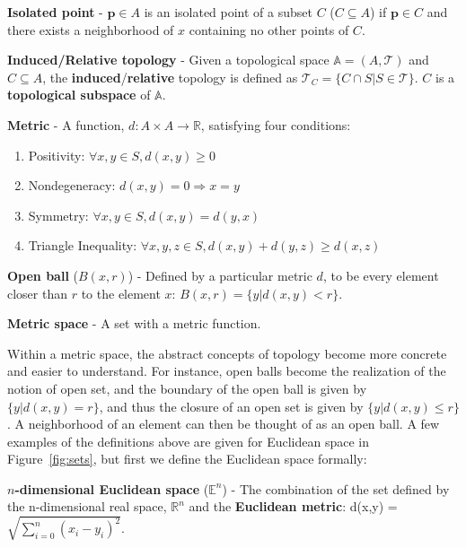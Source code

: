 \begin{defn}
  \textbf{Isolated point} - $\mathbf{p} \in A$ is an isolated point of a
  subset $C$ ($C \subseteq A$) if $\mathbf{p} \in C$ and there exists a
  neighborhood of $x$ containing no other points of $C$.
\end{defn}

\begin{defn}
  \textbf{Induced/Relative topology} - Given a topological space
  $\mathbb{A}=(A,\mathcal{T})$ and $C \subseteq A$,
  the \textbf{induced}/\textbf{relative} topology is defined as
  $\mathcal{T}_C = \{C \cap S | S \in \mathcal{T}\}$. $C$ is a
  \textbf{topological subspace} of $\mathbb{A}$.
\end{defn}

\begin{defn}
  \textbf{Metric} - A function, $d: A \times A \rightarrow \mathbb{R}$,
  satisfying four conditions:
  \begin{enumerate}
  \item Positivity: $\forall x,y \in S, d(x,y) \ge 0$
  \item Nondegeneracy: $d(x,y)=0 \Rightarrow x=y$
  \item Symmetry: $\forall x,y \in S, d(x,y) = d(y,x)$
  \item Triangle Inequality: $\forall x,y,z \in S, d(x,y) + d(y,z) \ge d(x,z)$
  \end{enumerate}
\end{defn}
\begin{defn}
  \textbf{Open ball} ($B(x,r)$) - Defined by a particular metric $d$, to be
  every element closer than $r$ to the element $x$: $B(x,r) = \{y| d(x,y) < r\}$.
\end{defn}
\begin{defn}
  \textbf{Metric space} - A set with a metric function.
\end{defn}

Within a metric space, the abstract concepts of topology become more concrete and easier to understand.
%
For instance, open balls become the realization of the notion of open set, and the boundary of the open ball is given by $\{y| d(x,y) = r\}$, and thus the closure of an open set is given by $\{y| d(x,y) \leq r\}$.
%
A neighborhood of an element can then be thought of as an open ball.
%
A few examples of the definitions above are given for Euclidean space in Figure~\ref{fig:sets}, but first we define the Euclidean space formally:

\begin{defn}
  \textbf{$n$-dimensional Euclidean space} ($\mathbb{E}^n$) - The combination of
  the set defined by the n-dimensional real space, $\mathbb{R}^n$ and the
  \textbf{Euclidean metric}: d(x,y) = $\sqrt{\sum_{i=0}^n(x_i-y_i)^2}$.
\end{defn}

